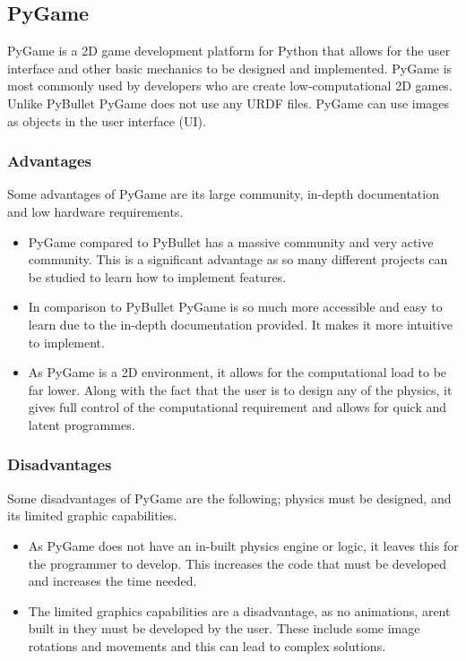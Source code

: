 \documentclass[a4paper,12pt]{article}
\begin{document}
\subsection{PyGame}

PyGame is a 2D game development platform for Python that allows for the user interface and other basic mechanics to be designed and implemented. PyGame is most commonly used by developers who are create low-computational 2D games. Unlike PyBullet PyGame does not use any URDF files. PyGame can use images as objects in the user interface (UI). 

\subsubsection{Advantages}
Some advantages of PyGame are its large community, in-depth documentation and low hardware requirements. 

\begin{itemize}
  \item PyGame compared to PyBullet has a massive community and very active community. This is a significant advantage as so many different projects can be studied to learn how to implement features. 
  \item In comparison to PyBullet PyGame is so much more accessible and easy to learn due to the in-depth documentation provided. It makes it more intuitive to implement. 

  \item As PyGame is a 2D environment, it allows for the computational load to be far lower. Along with the fact that the user is to design any of the physics, it gives full control of the computational requirement and allows for quick and latent programmes.


\end{itemize}


\subsubsection{Disadvantages}

Some disadvantages of PyGame are the following; physics must be designed, and its limited graphic capabilities. 
\begin{itemize}
  \item As PyGame does not have an in-built physics engine or logic, it leaves this for the programmer to develop. This increases the code that must be developed and increases the time needed. 
  \item The limited graphics capabilities are a disadvantage, as no animations, arent built in they must be developed by the user. These include some image rotations and movements and this can lead to complex solutions.

\end{itemize}
\end{document}
